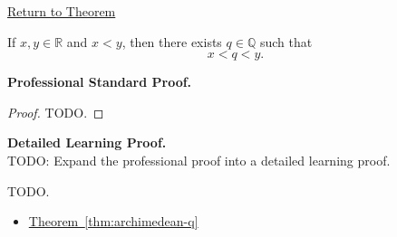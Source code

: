 \newpage
{}
\label{prf:q-dense-in-r}

\begin{remark*}[Return]
\hyperref[thm:q-dense-in-r]{Return to Theorem}
\end{remark*}

\begin{theorem*}
If $x,y\in\mathbb{R}$ and $x<y$, then there exists $q\in\mathbb{Q}$ such that
\[
x<q<y.
\]
\end{theorem*}

\textbf{Professional Standard Proof.}~\\
\begin{proof}
TODO.
\end{proof}

\textbf{Detailed Learning Proof.}~\\
TODO: Expand the professional proof into a detailed learning proof.


\begin{remark*}
TODO.
\end{remark*}

\begin{dependencies}
\begin{itemize}
  \item \hyperref[thm:archimedean-q]{Theorem~\ref*{thm:archimedean-q}}
\end{itemize}
\end{dependencies}


